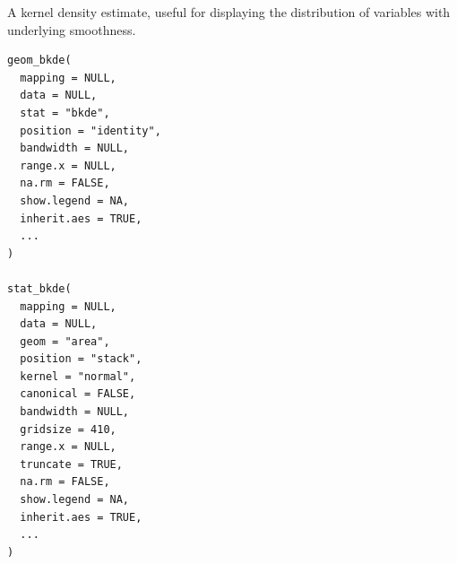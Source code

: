 \documentclass[a4paper]{book}
\begin{document}
%
\begin{SeeAlso}
\end{SeeAlso}
%
\begin{Description}
A kernel density estimate, useful for displaying the distribution of
variables with underlying smoothness.
\end{Description}
%
\begin{Usage}
\begin{verbatim}
geom_bkde(
  mapping = NULL,
  data = NULL,
  stat = "bkde",
  position = "identity",
  bandwidth = NULL,
  range.x = NULL,
  na.rm = FALSE,
  show.legend = NA,
  inherit.aes = TRUE,
  ...
)

stat_bkde(
  mapping = NULL,
  data = NULL,
  geom = "area",
  position = "stack",
  kernel = "normal",
  canonical = FALSE,
  bandwidth = NULL,
  gridsize = 410,
  range.x = NULL,
  truncate = TRUE,
  na.rm = FALSE,
  show.legend = NA,
  inherit.aes = TRUE,
  ...
)
\end{verbatim}
\end{Usage}
%
\end{document}
